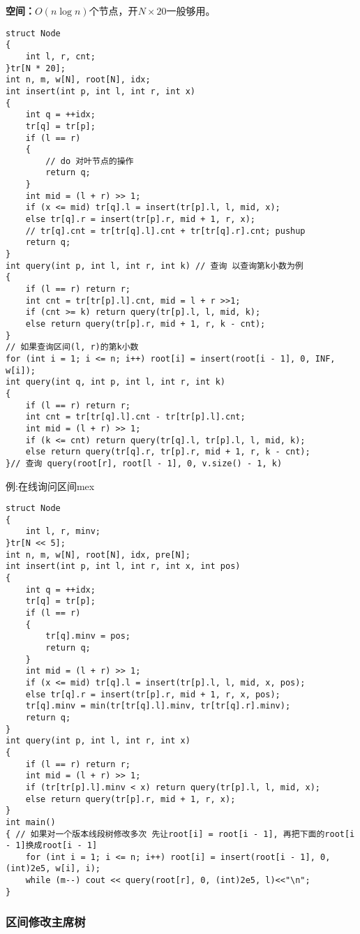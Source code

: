\documentclass[a4paper, fontset=none]{ctexart}
\begin{document}
\textbf{空间：}$O(n\log n)$个节点，开$N \times 20$一般够用。
\begin{verbatim}
struct Node
{
    int l, r, cnt;
}tr[N * 20];
int n, m, w[N], root[N], idx;
int insert(int p, int l, int r, int x)
{
    int q = ++idx;
    tr[q] = tr[p];
    if (l == r)
    {
        // do 对叶节点的操作
        return q;
    }
    int mid = (l + r) >> 1;
    if (x <= mid) tr[q].l = insert(tr[p].l, l, mid, x);
    else tr[q].r = insert(tr[p].r, mid + 1, r, x);
    // tr[q].cnt = tr[tr[q].l].cnt + tr[tr[q].r].cnt; pushup
    return q;
}
int query(int p, int l, int r, int k) // 查询 以查询第k小数为例
{
    if (l == r) return r;
    int cnt = tr[tr[p].l].cnt, mid = l + r >>1;
    if (cnt >= k) return query(tr[p].l, l, mid, k);
    else return query(tr[p].r, mid + 1, r, k - cnt);
}
// 如果查询区间(l, r)的第k小数
for (int i = 1; i <= n; i++) root[i] = insert(root[i - 1], 0, INF, w[i]);
int query(int q, int p, int l, int r, int k)
{
    if (l == r) return r;
    int cnt = tr[tr[q].l].cnt - tr[tr[p].l].cnt;
    int mid = (l + r) >> 1;
    if (k <= cnt) return query(tr[q].l, tr[p].l, l, mid, k);
    else return query(tr[q].r, tr[p].r, mid + 1, r, k - cnt);
}// 查询 query(root[r], root[l - 1], 0, v.size() - 1, k)
\end{verbatim}

例:在线询问区间mex
\begin{verbatim}
struct Node
{
    int l, r, minv;
}tr[N << 5];
int n, m, w[N], root[N], idx, pre[N];
int insert(int p, int l, int r, int x, int pos)
{
    int q = ++idx;
    tr[q] = tr[p];
    if (l == r)
    {
        tr[q].minv = pos;
        return q;
    }
    int mid = (l + r) >> 1;
    if (x <= mid) tr[q].l = insert(tr[p].l, l, mid, x, pos);
    else tr[q].r = insert(tr[p].r, mid + 1, r, x, pos);
    tr[q].minv = min(tr[tr[q].l].minv, tr[tr[q].r].minv);
    return q;
}
int query(int p, int l, int r, int x)
{
    if (l == r) return r;
    int mid = (l + r) >> 1;
    if (tr[tr[p].l].minv < x) return query(tr[p].l, l, mid, x);
    else return query(tr[p].r, mid + 1, r, x);
}
int main()
{ // 如果对一个版本线段树修改多次 先让root[i] = root[i - 1], 再把下面的root[i - 1]换成root[i - 1]
    for (int i = 1; i <= n; i++) root[i] = insert(root[i - 1], 0, (int)2e5, w[i], i);
    while (m--) cout << query(root[r], 0, (int)2e5, l)<<"\n";
}
\end{verbatim}
\subsubsection{区间修改主席树}
\end{document}
